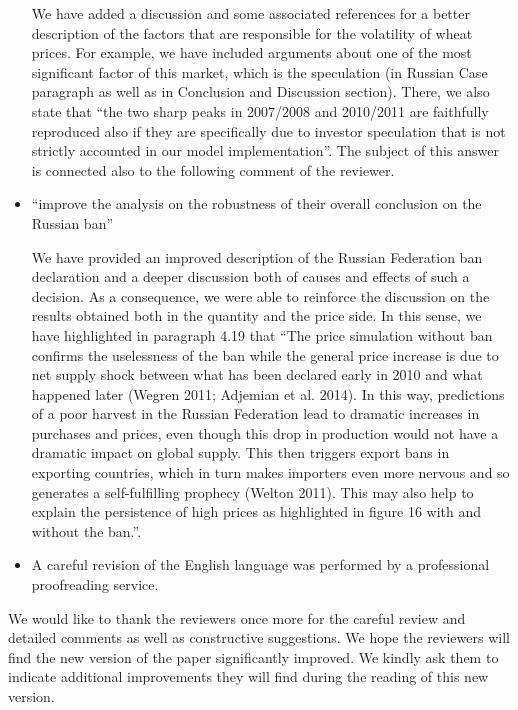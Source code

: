 \documentclass[a4paper,12pt]{article}
\begin{document}
\begin{itemize}
    We have added a discussion and some associated references for a better description of the factors that are responsible for the volatility of wheat prices. For example, we have included arguments about one of the most significant factor of this market, which is the speculation (in Russian Case paragraph as well as in Conclusion and Discussion section). There, we also state that ``the two sharp peaks in 2007/2008 and 2010/2011 are faithfully reproduced also if they are specifically due to investor speculation that is not strictly accounted in our model implementation''. The subject of this answer is connected also to the following comment of the reviewer.
    
    \item ``improve the analysis on the robustness of their overall conclusion on the Russian ban''
    
	    We have provided an improved description of the Russian Federation ban declaration and a deeper discussion both of causes and effects of such a decision. As a consequence, we were able to reinforce the discussion on the results obtained both in the quantity and the price side. In this sense, we have highlighted in paragraph 4.19 that  ``The price simulation without ban confirms the uselessness of the ban while the general price increase is due to net supply shock between what has been declared early in 2010 and what happened later (Wegren 2011; Adjemian et al. 2014). In this way, predictions of a poor harvest in the Russian Federation lead to dramatic increases in purchases and prices, even though this drop in production would not have a dramatic impact on global supply. This then triggers export bans in exporting countries, which in turn makes importers even more nervous and so generates a self-fulfilling prophecy (Welton 2011). This may also help to explain the persistence of high prices as highlighted in figure 16 with and without the ban.''. 

\item A careful revision of the English language was performed by a professional proofreading service.
	
\end{itemize}


\vskip1cm
We would like to thank the reviewers once more for the careful review and detailed comments as well as constructive suggestions. We hope the reviewers will find the new version of the paper significantly improved. We kindly ask them to indicate additional improvements they will find during the reading of this new version. 
\end{document}
